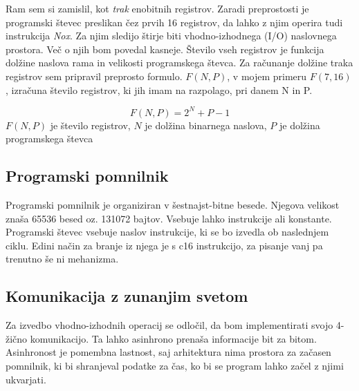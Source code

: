 \documentclass[12pt]{article}
\begin{document}
Ram sem si zamislil, kot \textit{trak} enobitnih registrov.
Zaradi preprostosti je programski števec preslikan čez prvih 16 registrov, da lahko z njim operira tudi instrukcija \textit{Nox}.
Za njim sledijo štirje biti vhodno-izhodnega (I/O) naslovnega prostora.
Več o njih bom povedal kasneje.
Število vseh registrov je funkcija dolžine naslova rama in velikosti programskega števca.
Za računanje dolžine traka registrov sem pripravil preprosto formulo.
$F(N,P)$, v mojem primeru $F(7,16)$, izračuna število registrov, ki jih imam na razpolago, pri danem N in P.
\begin{center}
  \begin{displaymath}
    F(N,P)=2^{N}+P-1
  \end{displaymath}
  $F(N,P)$ je število registrov, $N$ je dolžina binarnega naslova, $P$ je dolžina programskega števca
\end{center}

\subsection{Programski pomnilnik}
Programski pomnilnik je organiziran v šestnajst-bitne besede.
Njegova velikost znaša 65536 besed oz. 131072 bajtov.
Vsebuje lahko instrukcije ali konstante.
Programski števec vsebuje naslov instrukcije, ki se bo izvedla ob naslednjem ciklu.
Edini način za branje iz njega je s c16 instrukcijo, za pisanje vanj pa trenutno še ni mehanizma.


\subsection{Komunikacija z zunanjim svetom}
Za izvedbo vhodno-izhodnih operacij se odločil, da bom implementirati svojo 4-žično komunikacijo.
Ta lahko asinhrono prenaša informacije bit za bitom.
Asinhronost je pomembna lastnost, saj arhitektura nima prostora za začasen pomnilnik, ki bi shranjeval podatke za čas, ko bi se program lahko začel z njimi ukvarjati.
\end{document}
